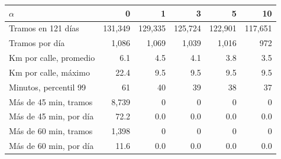 \begin{tabular}{@{}lrrrrr@{}}
\toprule
$\alpha$ & 0 & 1 & 3 & 5 & 10 \\
\midrule
Tramos en 121 días & 131,349 & 129,335 & 125,724 & 122,901 & 117,651 \\
Tramos por día & 1,086 & 1,069 & 1,039 & 1,016 & 972 \\
Km por calle, promedio & 6.1 & 4.5 & 4.1 & 3.8 & 3.5 \\
Km por calle, máximo & 22.4 & 9.5 & 9.5 & 9.5 & 9.5 \\
Minutos, percentil 99 & 61 & 40 & 39 & 38 & 37 \\
Más de 45 min, tramos & 8,739 & 0 & 0 & 0 & 0 \\
Más de 45 min, por día & 72.2 & 0.0 & 0.0 & 0.0 & 0.0 \\
Más de 60 min, tramos & 1,398 & 0 & 0 & 0 & 0 \\
Más de 60 min, por día & 11.6 & 0.0 & 0.0 & 0.0 & 0.0 \\
\bottomrule
\end{tabular}

